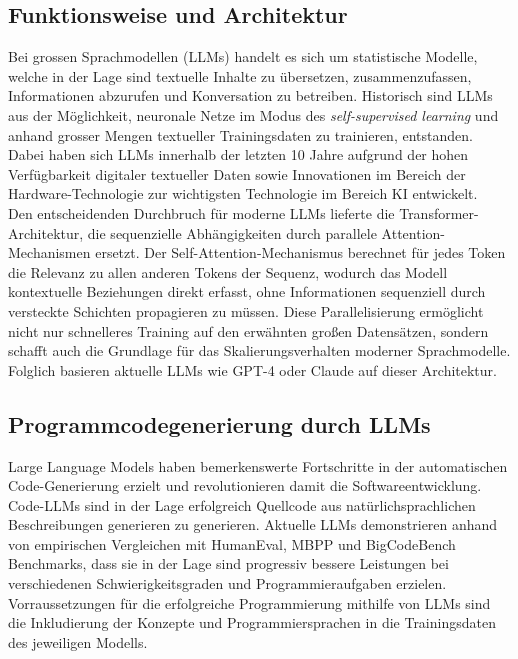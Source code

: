 \subsection{Funktionsweise und Architektur}
Bei grossen Sprachmodellen (LLMs) handelt es sich um statistische Modelle,
welche in der Lage sind textuelle Inhalte zu übersetzen, zusammenzufassen,
Informationen abzurufen und Konversation zu betreiben. Historisch sind LLMs aus
der Möglichkeit, neuronale Netze im Modus des \textit{self-supervised learning}
und anhand grosser Mengen textueller Trainingsdaten zu trainieren, entstanden.
Dabei haben sich LLMs innerhalb der letzten 10 Jahre aufgrund der hohen Verfügbarkeit digitaler
textueller Daten sowie Innovationen im Bereich der Hardware-Technologie zur
wichtigsten Technologie im Bereich KI entwickelt. \\

\noindent
Den entscheidenden Durchbruch für moderne LLMs lieferte die
Transformer-Architektur, die sequenzielle Abhängigkeiten durch parallele
Attention-Mechanismen ersetzt. Der Self-Attention-Mechanismus berechnet für
jedes Token die Relevanz zu allen anderen Tokens der Sequenz, wodurch das Modell
kontextuelle Beziehungen direkt erfasst, ohne Informationen sequenziell durch
versteckte Schichten propagieren zu müssen. Diese Parallelisierung ermöglicht
nicht nur schnelleres Training auf den erwähnten großen Datensätzen, sondern
schafft auch die Grundlage für das Skalierungsverhalten moderner Sprachmodelle.
Folglich basieren aktuelle LLMs wie GPT-4 oder Claude auf
dieser Architektur.

\subsection{Programmcodegenerierung durch LLMs}%
Large Language Models haben bemerkenswerte Fortschritte in der automatischen
Code-Generierung erzielt und revolutionieren damit die Softwareentwicklung.
Code-LLMs sind in der Lage erfolgreich Quellcode aus natürlichsprachlichen
Beschreibungen generieren zu generieren. Aktuelle LLMs demonstrieren anhand von
empirischen Vergleichen mit HumanEval, MBPP und BigCodeBench Benchmarks, dass
sie in der Lage sind progressiv bessere Leistungen bei verschiedenen
Schwierigkeitsgraden und Programmieraufgaben erzielen. 
Vorraussetzungen für die erfolgreiche Programmierung mithilfe von LLMs sind die
Inkludierung der Konzepte und Programmiersprachen in die Trainingsdaten des
jeweiligen Modells.\\

